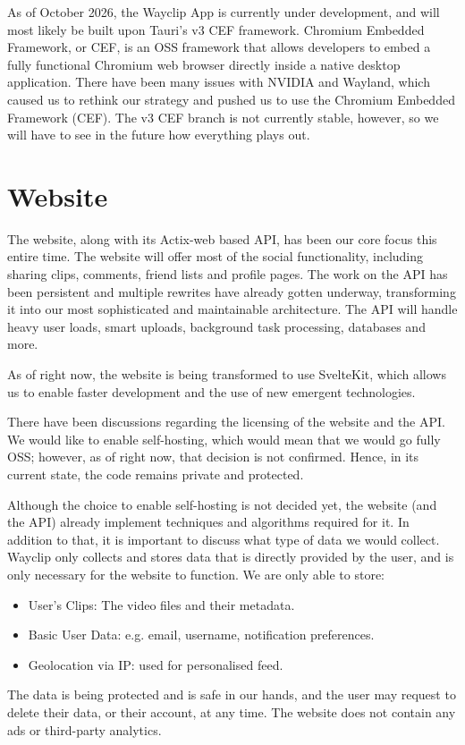 As of October 2026, the Wayclip App is currently under development, and will most likely be built upon Tauri's v3 CEF framework. Chromium Embedded Framework, or CEF, is an OSS framework that allows developers to embed a fully functional Chromium web browser directly inside a native desktop application.
There have been many issues with NVIDIA and Wayland, which caused us to rethink our strategy and pushed us to use the Chromium Embedded Framework (CEF).
The v3 CEF branch is not currently stable, however, so we will have to see in the future how everything plays out.

\section{Website}

The website, along with its Actix-web based API, has been our core focus this entire time. The website will offer most of the social functionality, including sharing clips, comments, friend lists and profile pages.
The work on the API has been persistent and multiple rewrites have already gotten underway, transforming it into our most sophisticated and maintainable architecture.
The API will handle heavy user loads, smart uploads, background task processing, databases and more.

As of right now, the website is being transformed to use SvelteKit, which allows us to enable faster development and the use of new emergent technologies.

There have been discussions regarding the licensing of the website and the API. We would like to enable self-hosting, which would mean that we would go fully OSS; however, as of right now, that decision is not confirmed.
Hence, in its current state, the code remains private and protected.

Although the choice to enable self-hosting is not decided yet, the website (and the API) already implement techniques and algorithms required for it. In addition to that, it is important to discuss what type of data we would collect.
Wayclip only collects and stores data that is directly provided by the user, and is only necessary for the website to function. We are only able to store:
\begin{itemize}
	\item User's Clips: The video files and their metadata.
	\item Basic User Data: e.g. email, username, notification preferences.
	\item Geolocation via IP: used for personalised feed.
\end{itemize}
The data is being protected and is safe in our hands, and the user may request to delete their data, or their account, at any time.
The website does not contain any ads or third-party analytics.
